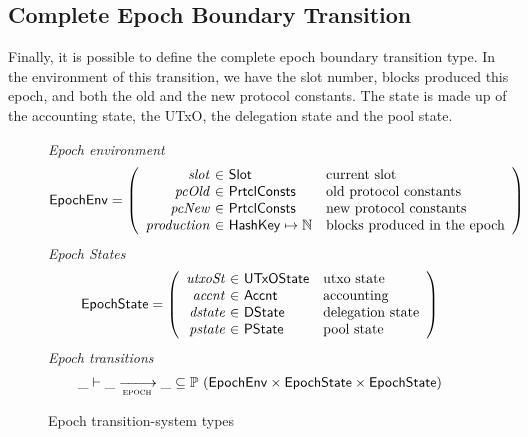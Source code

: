 \subsection{Complete Epoch Boundary Transition}
\label{sec:total-epoch}

Finally, it is possible to define the complete epoch boundary transition type.
In the environment of this transition, we have the slot number, blocks produced
this epoch, and both the old and the new protocol constants. The state is
made up of the accounting state, the UTxO, the delegation state and the
pool state.

\begin{figure}[htb]
  \emph{Epoch environment}
  \begin{equation*}
    \EpochEnv =
    \left(
      \begin{array}{r@{~\in~}ll}
        \var{slot} & \Slot & \text{current slot}\\
        \var{pcOld} & \PrtclConsts & \text{old protocol constants}\\
        \var{pcNew} & \PrtclConsts & \text{new protocol constants}\\
        \var{production} & \HashKey \mapsto \mathbb{N} & \text{blocks produced in the epoch}\\
      \end{array}
    \right)
  \end{equation*}
  \emph{Epoch States}
  \begin{equation*}
    \EpochState =
    \left(
      \begin{array}{r@{~\in~}ll}
        \var{utxoSt} & \UTxOState & \text{utxo state}\\
        \var{accnt} & \Accnt & \text{accounting}\\
        \var{dstate} & \DState & \text{delegation state}\\
        \var{pstate} & \PState & \text{pool state}\\
      \end{array}
    \right)
  \end{equation*}
  \emph{Epoch transitions}
  \begin{equation*}
    \_ \vdash
    \var{\_} \trans{epoch}{} \var{\_}
    \subseteq \powerset (\EpochEnv \times \EpochState \times \EpochState)
  \end{equation*}
  \caption{Epoch transition-system types}
  \label{fig:ts-types:epoch}
\end{figure}


